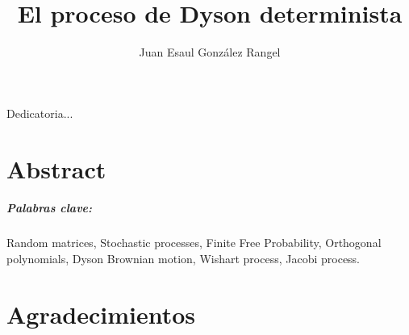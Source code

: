 \documentclass[letterpaper,11pt,twoside]{book}  %
\author{Juan Esaul González Rangel}
\title{El proceso de Dyson determinista}
\begin{document}
\maketitle  %

\listoftodos

\thispagestyle{empty}  %

\frontmatter
\chapter*{}
\begin{flushright}%

  
  
  

  Dedicatoria...
  \thispagestyle{empty}
\end{flushright}



\chapter*{Abstract}




\paragraph{Palabras clave:} Random matrices, Stochastic processes, Finite Free Probability, Orthogonal polynomials, Dyson Brownian motion, Wishart process, Jacobi process.

\chapter*{Agradecimientos}
\end{document}
